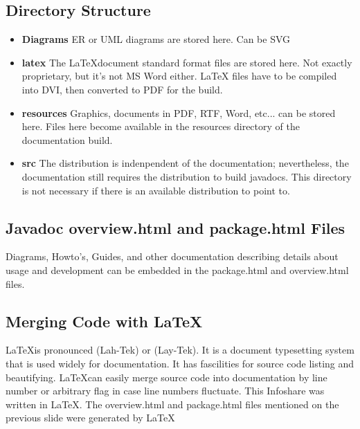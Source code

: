 \documentclass[12pt,notitlepage]{article}
\begin{document}
\begin{s5presentation}
\begin{ifhtml}
\begin{s5slide}
        \section{Directory Structure}
        \begin{itemize}
      \item \textbf{Diagrams}
        ER or UML diagrams are stored here. Can be SVG
      \item \textbf{latex}
        The \LaTeX document standard format files are stored here. Not exactly proprietary, but
        it's not MS Word either. LaTeX files have to be compiled into DVI, then converted to PDF for
        the build.
      \item \textbf{resources}
          Graphics, documents in PDF, RTF, Word, etc... can be stored here. Files here become
          available in the resources directory of the documentation build.
        \item \textbf{src}
          The distribution is indenpendent of the documentation; nevertheless, the 
          documentation still requires the distribution to build javadocs. This directory 
          is not necessary if there is an available distribution to point to.
      \end{itemize}
      \end{s5slide}
    \begin{s5slide}
      \section{Javadoc overview.html and package.html Files}
      Diagrams, Howto's, Guides, and other documentation describing details about usage and development 
      can be embedded in the package.html and overview.html files.
    \end{s5slide}
    \begin{s5slide}
      \section{Merging Code with \LaTeX}
      \LaTeX is pronounced (Lah-Tek) or (Lay-Tek). It is a document typesetting system that is used 
      widely for documentation. It has fascilities for source code listing and beautifying. \LaTeX can
      easily merge source code into documentation by line number or arbitrary flag in case line numbers
      fluctuate.
      This Infoshare was written in \LaTeX. The overview.html and package.html files mentioned on the 
      previous slide were generated by \LaTeX
    \end{s5slide}
  \end{ifhtml}
  \W \end{s5presentation}
\end{document}
